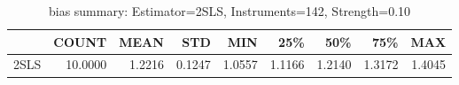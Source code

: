 \begin{table}[ht]
\centering
\caption{bias summary: Estimator=2SLS, Instruments=142, Strength=0.10}
\begin{tabular}{lrrrrrrrr}
\toprule
 & COUNT & MEAN & STD & MIN & 25\% & 50\% & 75\% & MAX \\
\midrule
2SLS & 10.0000 & 1.2216 & 0.1247 & 1.0557 & 1.1166 & 1.2140 & 1.3172 & 1.4045 \\
\bottomrule
\end{tabular}
\end{table}
